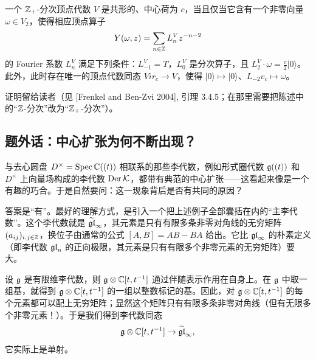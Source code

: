 \begin{lemma}
    一个 $\mathbb{Z}_+$-分次顶点代数 $V$ 是共形的、中心荷为 $c$，当且仅当它含有一个非零向量 $\omega\in V_2$，使得相应顶点算子
    \[
        Y(\omega,z) = \sum_{n\in\mathbb{Z}} L^V_n z^{-n-2}
    \]
    的 Fourier 系数 $L^V_n$ 满足下列条件：$L^V_{-1}=T$，$L^V_0$ 是分次算子，且 $L^V_2\cdot\omega=\frac{c}{2}|0\rangle$。此外，此时存在唯一的顶点代数同态 $\mathit{Vir}_c\to V$，使得 $|0\rangle\mapsto|0\rangle$、$L_{-2}v_c\mapsto\omega$。
\end{lemma}


证明留给读者（见 [Frenkel and Ben-Zvi 2004], 引理 3.4.5；在那里需要把陈述中的“$\mathbb{Z}$-分次”改为“$\mathbb{Z}_+$-分次”）。

\subsection{题外话：中心扩张为何不断出现？}

与去心圆盘 $D^\times=\operatorname{Spec}\mathbb{C}((t))$ 相联系的那些李代数，例如形式圈代数 $\mathfrak{g}((t))$ 和 $D^\times$ 上向量场构成的李代数 $\operatorname{Der}\mathcal{K}$，都带有典范的中心扩张——这看起来像是一个有趣的巧合。于是自然要问：这一现象背后是否有共同的原因？

答案是“有”。最好的理解方式，是引入一个把上述例子全部囊括在内的“主李代数”。这个李代数就是 $\widetilde{\mathfrak{gl}}_\infty$，其元素是只有有限多条非零对角线的无穷矩阵 $(a_{ij})_{i,j\in\mathbb{Z}}$，换位子由通常的公式 $[A,B]=AB-BA$ 给出。它比 $\mathfrak{gl}_\infty$ 的朴素定义（即李代数 $\mathfrak{gl}_n$ 的正向极限，其元素是只有有限多个非零元素的无穷矩阵）要大。


设 $\mathfrak{g}$ 是有限维李代数，则 $\mathfrak{g}\otimes\mathbb{C}[t,t^{-1}]$ 通过伴随表示作用在自身上。在 $\mathfrak{g}$ 中取一组基，就得到 $\mathfrak{g}\otimes\mathbb{C}[t,t^{-1}]$ 的一组以整数标记的基。因此，对 $\mathfrak{g}\otimes\mathbb{C}[t,t^{-1}]$ 的每个元素都可以配上无穷矩阵；显然这个矩阵只有有限多条非零对角线（但有无限多个非零元素！）。于是我们得到李代数同态
\[
    \mathfrak{g}\otimes\mathbb{C}[t,t^{-1}] \to \widetilde{\mathfrak{gl}}_\infty,
\]
它实际上是单射。

